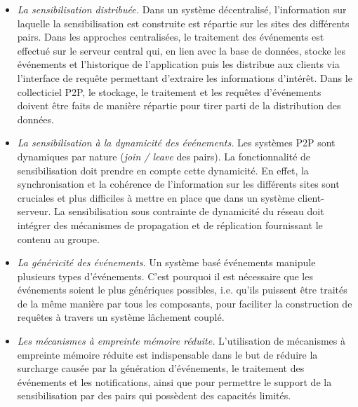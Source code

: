 \begin{itemize}
	\item \textit{La sensibilisation distribuée.} Dans un 
	système décentralisé, l'information sur laquelle la sensibilisation est construite 
	est répartie sur les sites des différents pairs. Dans les approches centralisées, 
	le traitement des événements est effectué sur le serveur central qui, en lien avec la base de données,
	stocke les événements et l'historique de l'application puis les distribue aux clients 
	via l'interface de requête permettant d'extraire les informations d'intérêt. 
	Dans le collecticiel \gls{P2P}, le stockage, le traitement et les requêtes d'événements 
	doivent être faits de manière répartie pour tirer parti de la distribution des données.
	
	\item \textit{La sensibilisation à la dynamicité des événements.} Les systèmes 
	\gls{P2P} 
	sont dynamiques par nature (\textit{join / leave} des pairs). La fonctionnalité de 
	sensibilisation doit prendre en compte cette dynamicité. En effet, la 
	synchronisation et la cohérence de l'information sur les différents sites sont 
	cruciales et plus difficiles à mettre en place que dans un système 
	client-serveur. La sensibilisation sous contrainte de dynamicité du réseau doit 
	intégrer des mécanismes de propagation et de réplication fournissant le contenu 
	au groupe. 
	
	\item \textit{La généricité des événements.} Un système basé événements manipule 
	plusieurs types d'événements. C'est pourquoi il est nécessaire que les 
	événements soient le plus génériques possibles, i.e. qu'ils puissent être traités 
	de la même manière par tous les composants, pour faciliter la construction de 
	requêtes à travers un système lâchement couplé.
	
	\item \textit{Les mécanismes à empreinte mémoire réduite.} L'utilisation de 
	mécanismes à empreinte mémoire réduite est indispensable dans le but de 
	réduire la surcharge causée par la génération d'événements, le traitement des 
	événements et les notifications, ainsi que pour permettre le support de la 
	sensibilisation par des pairs qui possèdent des capacités limités.
	
\end{itemize}
%

